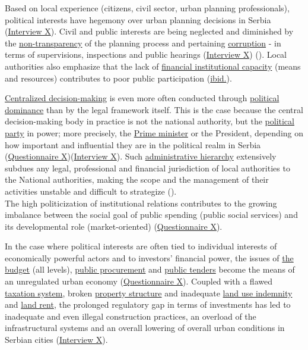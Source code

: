 \documentclass[11pt]{report}
\begin{document}
{{{{\begin{itemize}
Based on local experience (citizens, civil sector, urban planning professionals), political interests have hegemony over urban planning decisions in Serbia (\href{InterviewX}{Interview X}).
Civil and public interests are being neglected and diminished by the \underline{non-transparency} of the planning process and pertaining \underline{corruption} - in terms of supervisions, inspections and public hearings (\href{InterviewX}{Interview X})
(\href{ref}{\citealt{ministarstvo_prostora_urbani_2014}}).
Local authorities also emphasize that the lack of \underline{financial institutional capacity} (means and resources) contributes to poor public participation (\href{ref}{ibid.}).

\underline{Centralized decision-making} is even more often conducted through \underline{political dominance} than by the legal framework itself.
This is the case because the central decision-making body in practice is not the national authority, but the \underline{political party} in power;
more precisely, the  \underline{Prime minister} or the President, depending on how important and influential they are in the political realm in Serbia (\href{Questionnaire Experts Post-socialist}{Questionnaire X})(\href{InterviewX}{Interview X}).
Such \underline{administrative hierarchy} extensively subdues any legal, professional and financial jurisdiction of local authorities to the National authorities, making the scope and the management of their activities unstable and difficult to strategize (\href{Vujosevic}{\citealt{vujosevic_novi_2012}}).
\\
The high politicization of institutional relations contributes to the growing imbalance between the social goal of public spending (public social services) and its developmental role (market-oriented) (\href{Questionnaire Experts Post-socialist}{Questionnaire X}).

In the case where political interests are often tied to individual interests of economically powerful actors and to investors' financial power, the issues of \underline{the budget} (all levels), \underline{public procurement} and \underline{public tenders} become the means of an unregulated urban economy (\href{Questionnaire Experts Post-socialist}{Questionnaire X}).%
Coupled with a flawed \underline{taxation system}, broken \underline{property structure} and inadequate \underline{land use indemnity} and \underline{land rent}, the prolonged regulatory gap in terms of investments has led to inadequate and even illegal construction practices, an overload of the infrastructural systems and an overall lowering of overall urban conditions in Serbian cities (\href{InterviewX}{Interview X}).


\end{itemize}}}}}
\end{document}
